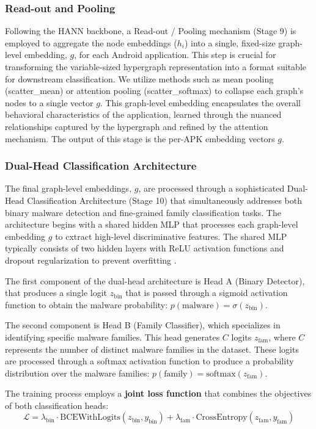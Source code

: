 \documentclass[runningheads]{llncs}
\begin{document}
\subsubsection{Read-out and Pooling}
Following the HANN backbone, a Read-out / Pooling mechanism (Stage 9) is employed to aggregate the node embeddings ($h_i$) into a single, fixed-size graph-level embedding, $g$, for each Android application. This step is crucial for transforming the variable-sized hypergraph representation into a format suitable for downstream classification. We utilize methods such as mean pooling (scatter\_mean) or attention pooling (scatter\_softmax) to collapse each graph's nodes to a single vector $g$. This graph-level embedding encapsulates the overall behavioral characteristics of the application, learned through the nuanced relationships captured by the hypergraph and refined by the attention mechanism. The output of this stage is the per-APK embedding vectors $g$.


\subsubsection{Dual-Head Classification Architecture}
The final graph-level embeddings, $g$, are processed through a sophisticated Dual-Head Classification Architecture (Stage 10) that simultaneously addresses both binary malware detection and fine-grained family classification tasks. 
The architecture begins with a shared hidden MLP that processes each graph-level embedding $g$ to cxtract high-level discriminative features. The shared MLP typically consists of two hidden layers with ReLU activation functions and dropout regularization to prevent overfitting \cite{banerjee2019empirical}.

The first component of the dual-head architecture is Head A (Binary Detector), that produces a single logit $z_{\text{bin}}$ that is passed through a sigmoid activation function to obtain the malware probability: $p(\text{malware}) = \sigma(z_{\text{bin}})$.

The second component is Head B (Family Classifier), which specializes in identifying specific malware families. This head generates $C$ logits $z_{\text{fam}}$, where $C$ represents the number of distinct malware families in the dataset. These logits are processed through a softmax activation function to produce a probability distribution over the malware families: $p(\text{family}) = \text{softmax}(z_{\text{fam}})$.

The training process employs a \textbf{joint loss function} that combines the objectives of both classification heads:
\begin{equation}
\mathcal{L} = \lambda_{\text{bin}} \cdot \text{BCEWithLogits}(z_{\text{bin}}, y_{\text{bin}}) + \lambda_{\text{fam}} \cdot \text{CrossEntropy}(z_{\text{fam}}, y_{\text{fam}})
\end{equation}
\end{document}
